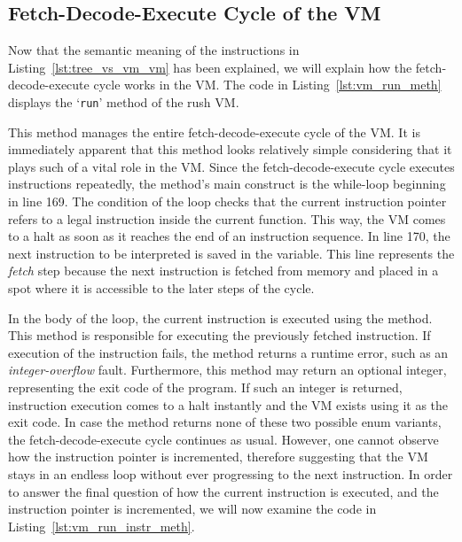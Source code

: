 \subsection{Fetch-Decode-Execute Cycle of the VM}
Now that the semantic meaning of the instructions in Listing~\ref{lst:tree_vs_vm_vm} has been explained, we will explain how the fetch-decode-execute cycle works in the VM\@.
The code in Listing~\ref{lst:vm_run_meth} displays the `\texttt{run}' method of the rush VM\@.


This method manages the entire fetch-decode-execute cycle of the VM\@.
It is immediately apparent that this method looks relatively simple considering that it plays such of a vital role in the VM\@.
Since the fetch-decode-execute cycle executes instructions repeatedly, the method's main construct is the while-loop beginning in line 169.
The condition of the loop checks that the current instruction pointer refers to a legal instruction inside the current function.
This way, the VM comes to a halt as soon as it reaches the end of an instruction sequence.
In line 170, the next instruction to be interpreted is saved in the  variable.
This line represents the \emph{fetch} step because the next instruction is fetched from memory and placed in a spot where it is accessible to the later steps of the cycle.

In the body of the loop, the current instruction is executed using the  method.
This method is responsible for executing the previously fetched instruction.
If execution of the instruction fails, the method returns a runtime error, such as an \emph{integer-overflow} fault.
Furthermore, this method may return an optional integer, representing the exit code of the program.
If such an integer is returned, instruction execution comes to a halt instantly and the VM exists using it as the exit code.
In case the method returns none of these two possible enum variants, the fetch-decode-execute cycle continues as usual.
However, one cannot observe how the instruction pointer is incremented, therefore suggesting that the VM stays in an endless loop without ever progressing to the next instruction.
In order to answer the final question of how the current instruction is executed, and the instruction pointer is incremented, we will now examine the code in Listing~\ref{lst:vm_run_instr_meth}.

